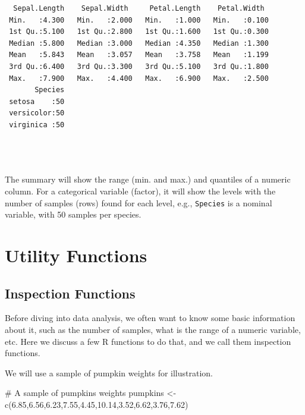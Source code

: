 \documentclass[
  letterpaper,
  DIV=11,
  numbers=noendperiod]{scrreprt}
\newenvironment{Shaded}{\begin{snugshade}}{\end{snugshade}}
\newcommand{\CommentTok}[1]{\textcolor[rgb]{0.37,0.37,0.37}{#1}}
\newcommand{\FloatTok}[1]{\textcolor[rgb]{0.68,0.00,0.00}{#1}}
\newcommand{\FunctionTok}[1]{\textcolor[rgb]{0.28,0.35,0.67}{#1}}
\newcommand{\NormalTok}[1]{\textcolor[rgb]{0.00,0.23,0.31}{#1}}
\newcommand{\OtherTok}[1]{\textcolor[rgb]{0.00,0.23,0.31}{#1}}
\begin{document}
\begin{verbatim}
  Sepal.Length    Sepal.Width     Petal.Length    Petal.Width   
 Min.   :4.300   Min.   :2.000   Min.   :1.000   Min.   :0.100  
 1st Qu.:5.100   1st Qu.:2.800   1st Qu.:1.600   1st Qu.:0.300  
 Median :5.800   Median :3.000   Median :4.350   Median :1.300  
 Mean   :5.843   Mean   :3.057   Mean   :3.758   Mean   :1.199  
 3rd Qu.:6.400   3rd Qu.:3.300   3rd Qu.:5.100   3rd Qu.:1.800  
 Max.   :7.900   Max.   :4.400   Max.   :6.900   Max.   :2.500  
       Species  
 setosa    :50  
 versicolor:50  
 virginica :50  
                
                
                
\end{verbatim}

The summary will show the range (min. and max.) and quantiles of a
numeric column. For a categorical variable (factor), it will show the
levels with the number of samples (rows) found for each level, e.g.,
\texttt{Species} is a nominal variable, with 50 samples per species.

\section{Utility Functions}\label{utility-functions}

\subsection{Inspection Functions}\label{inspection-functions}

Before diving into data analysis, we often want to know some basic
information about it, such as the number of samples, what is the range
of a numeric variable, etc. Here we discuss a few R functions to do
that, and we call them inspection functions.

We will use a sample of pumpkin weights for illustration.

\begin{Shaded}
\begin{Highlighting}[]
\CommentTok{\# A sample of pumpkins\textquotesingle{} weights}
\NormalTok{pumpkins }\OtherTok{\textless{}{-}} \FunctionTok{c}\NormalTok{(}\FloatTok{6.85}\NormalTok{,}\FloatTok{6.56}\NormalTok{,}\FloatTok{6.23}\NormalTok{,}\FloatTok{7.55}\NormalTok{,}\FloatTok{4.45}\NormalTok{,}\FloatTok{10.14}\NormalTok{,}\FloatTok{3.52}\NormalTok{,}\FloatTok{6.62}\NormalTok{,}\FloatTok{3.76}\NormalTok{,}\FloatTok{7.62}\NormalTok{)}
\end{Highlighting}
\end{Shaded}
\end{document}
